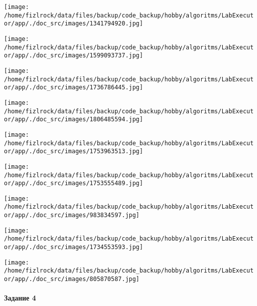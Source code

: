 \documentclass[a4paper, 12pt]{article}
\begin{document}
\texttt{[image: /home/fizlrock/data/files/backup/code\_backup/hobby/algoritms/LabExecutor/app/./doc\_src/images/1341794920.jpg]}

\texttt{[image: /home/fizlrock/data/files/backup/code\_backup/hobby/algoritms/LabExecutor/app/./doc\_src/images/1599093737.jpg]}

\texttt{[image: /home/fizlrock/data/files/backup/code\_backup/hobby/algoritms/LabExecutor/app/./doc\_src/images/1736786445.jpg]}

\texttt{[image: /home/fizlrock/data/files/backup/code\_backup/hobby/algoritms/LabExecutor/app/./doc\_src/images/1806485594.jpg]}

\texttt{[image: /home/fizlrock/data/files/backup/code\_backup/hobby/algoritms/LabExecutor/app/./doc\_src/images/1753963513.jpg]}

\texttt{[image: /home/fizlrock/data/files/backup/code\_backup/hobby/algoritms/LabExecutor/app/./doc\_src/images/1753555489.jpg]}

\texttt{[image: /home/fizlrock/data/files/backup/code\_backup/hobby/algoritms/LabExecutor/app/./doc\_src/images/983834597.jpg]}

\texttt{[image: /home/fizlrock/data/files/backup/code\_backup/hobby/algoritms/LabExecutor/app/./doc\_src/images/1734553593.jpg]}

\texttt{[image: /home/fizlrock/data/files/backup/code\_backup/hobby/algoritms/LabExecutor/app/./doc\_src/images/805870587.jpg]}
\pagebreak
\paragraph{Задание 4}
\end{document}
